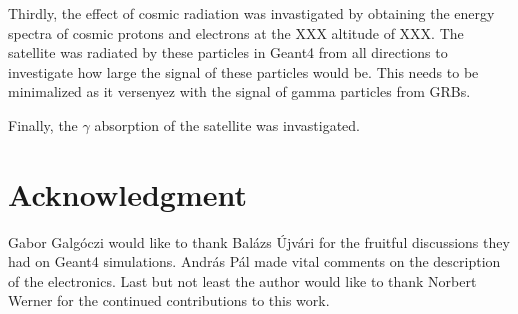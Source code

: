 \documentclass[12pt, a4paper,titlepage]{article}
\numberwithin{equation}{section}
\numberwithin{figure}{section}
\begin{document}
Thirdly, the effect of cosmic radiation was invastigated by obtaining the energy spectra of cosmic protons and electrons at the XXX altitude of XXX. The satellite was radiated by these particles in Geant4 from all directions to investigate how large the signal of these particles would be. This needs to be minimalized as it versenyez with the signal of gamma particles from GRBs.

Finally, the $\gamma$ absorption of the satellite was invastigated.

\pagebreak

\section{Acknowledgment}


Gabor Galg\'oczi would like to thank Bal\'azs \'Ujv\'ari for the fruitful discussions they had on Geant4 simulations. András Pál made vital comments on the description of the electronics. Last but not least the author would like to thank Norbert Werner for the continued contributions to this work.
 
\pagebreak
\end{document}
